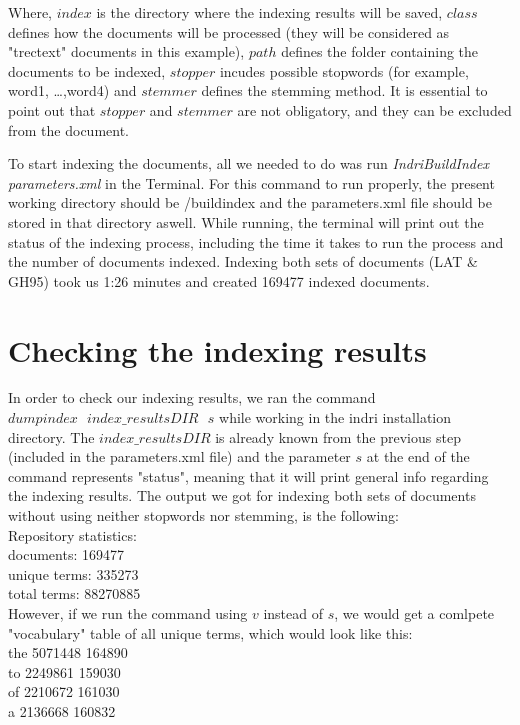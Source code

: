 \documentclass[letterpaper,11pt]{article}
\begin{document}
Where, $index$ is the directory where the indexing results will be saved, $class$ defines how the documents will be processed (they will be considered as "trectext" documents in this example), $path$ defines the folder containing the documents to be indexed, $stopper$ incudes possible stopwords (for example, word1, \dots ,word4) and $stemmer$ defines the stemming method. It is essential to point out that $stopper$ and $stemmer$ are not obligatory, and they can be excluded from the document. 

To start indexing the documents, all we needed to do was run \textit{IndriBuildIndex parameters.xml} in the Terminal. For this command to run properly, the present working directory should be /buildindex and the parameters.xml file should be stored in that directory aswell.	While running, the terminal will print out the status of the indexing process, including the time it takes to run the process and the number of documents indexed. Indexing both sets of documents (LAT \& GH95) took us 1:26 minutes and created 169477 indexed documents.

\section{Checking the indexing results}

In order to check our indexing results, we ran the command $dumpindex \text{ } index\_resultsDIR \text{ } s$ while working in the indri installation directory. The $index\_resultsDIR$ is already known from the previous step (included in the parameters.xml file) and the parameter $s$ at the end of the command represents "status", meaning that it will print general info regarding the indexing results. The output we got for indexing both sets of documents without using neither stopwords nor stemming, is the following: \\


Repository statistics:\\
documents:	169477\\
unique terms:	335273\\
total terms:	88270885\\

However, if we run the command using $v$ instead of $s$, we would get a comlpete "vocabulary" table of all unique terms, which would look like this: \\


the 5071448 164890\\
to 2249861 159030\\
of 2210672 161030\\
a 2136668 160832\\
\end{document}
